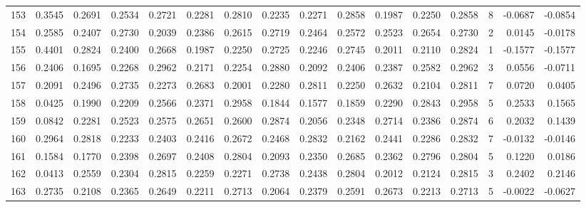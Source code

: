 \begin{tabular}{lrrrrrrrrrrrrrrr}
153 &      0.3545 &  0.2691 &  0.2534 &  0.2721 &  0.2281 &  0.2810 &  0.2235 &  0.2271 &  0.2858 &  0.1987 &   0.2250 &     0.2858 &      8 &                   -0.0687 &                    -0.0854 \\
154 &      0.2585 &  0.2407 &  0.2730 &  0.2039 &  0.2386 &  0.2615 &  0.2719 &  0.2464 &  0.2572 &  0.2523 &   0.2654 &     0.2730 &      2 &                    0.0145 &                    -0.0178 \\
155 &      0.4401 &  0.2824 &  0.2400 &  0.2668 &  0.1987 &  0.2250 &  0.2725 &  0.2246 &  0.2745 &  0.2011 &   0.2110 &     0.2824 &      1 &                   -0.1577 &                    -0.1577 \\
156 &      0.2406 &  0.1695 &  0.2268 &  0.2962 &  0.2171 &  0.2254 &  0.2880 &  0.2092 &  0.2406 &  0.2387 &   0.2582 &     0.2962 &      3 &                    0.0556 &                    -0.0711 \\
157 &      0.2091 &  0.2496 &  0.2735 &  0.2273 &  0.2683 &  0.2001 &  0.2280 &  0.2811 &  0.2250 &  0.2632 &   0.2104 &     0.2811 &      7 &                    0.0720 &                     0.0405 \\
158 &      0.0425 &  0.1990 &  0.2209 &  0.2566 &  0.2371 &  0.2958 &  0.1844 &  0.1577 &  0.1859 &  0.2290 &   0.2843 &     0.2958 &      5 &                    0.2533 &                     0.1565 \\
159 &      0.0842 &  0.2281 &  0.2523 &  0.2575 &  0.2651 &  0.2600 &  0.2874 &  0.2056 &  0.2348 &  0.2714 &   0.2386 &     0.2874 &      6 &                    0.2032 &                     0.1439 \\
160 &      0.2964 &  0.2818 &  0.2233 &  0.2403 &  0.2416 &  0.2672 &  0.2468 &  0.2832 &  0.2162 &  0.2441 &   0.2286 &     0.2832 &      7 &                   -0.0132 &                    -0.0146 \\
161 &      0.1584 &  0.1770 &  0.2398 &  0.2697 &  0.2408 &  0.2804 &  0.2093 &  0.2350 &  0.2685 &  0.2362 &   0.2796 &     0.2804 &      5 &                    0.1220 &                     0.0186 \\
162 &      0.0413 &  0.2559 &  0.2304 &  0.2815 &  0.2259 &  0.2271 &  0.2738 &  0.2438 &  0.2804 &  0.2012 &   0.2124 &     0.2815 &      3 &                    0.2402 &                     0.2146 \\
163 &      0.2735 &  0.2108 &  0.2365 &  0.2649 &  0.2211 &  0.2713 &  0.2064 &  0.2379 &  0.2591 &  0.2673 &   0.2213 &     0.2713 &      5 &                   -0.0022 &                    -0.0627 \\

\end{tabular}
